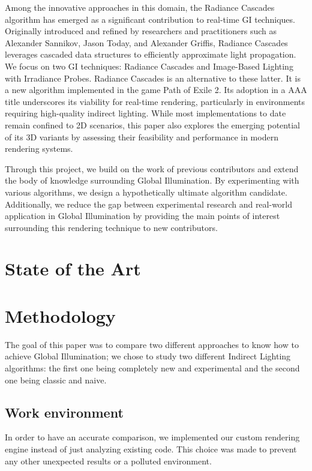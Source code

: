 \documentclass{rapportCS}
\begin{document}
Among the innovative approaches in this domain, the Radiance Cascades algorithm has emerged as a significant contribution to real-time GI techniques. Originally introduced and refined by researchers and practitioners such as Alexander Sannikov, Jason Today, and Alexander Griffis, Radiance Cascades leverages cascaded data structures to efficiently approximate light propagation. We focus on two GI techniques: Radiance Cascades and Image-Based Lighting with Irradiance Probes. Radiance Cascades is an alternative to these latter. It is a new algorithm implemented in the game Path of Exile 2. Its adoption in a AAA title underscores its viability for real-time rendering, particularly in environments requiring high-quality indirect lighting. While most implementations to date remain confined to 2D scenarios, this paper also explores the emerging potential of its 3D variants by assessing their feasibility and performance in modern rendering systems.

Through this project, we build on the work of previous contributors and extend the body of knowledge surrounding Global Illumination. By experimenting with various algorithms, we design a hypothetically ultimate algorithm candidate. Additionally, we reduce the gap between experimental research and real-world application in Global Illumination by providing the main points of interest surrounding this rendering technique to new contributors.


\section{State of the Art}


\section{Methodology}
The goal of this paper was to compare two different approaches to know how to achieve Global Illumination; we chose to study two different Indirect Lighting algorithms: the first one being completely new and experimental and the second one being classic and naive.

\subsection{Work environment}
In order to have an accurate comparison, we implemented our custom rendering engine instead of just analyzing existing code. This choice was made to prevent any other unexpected results or a polluted environment.
\end{document}
